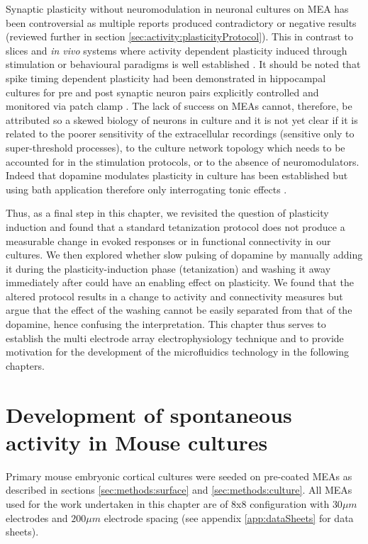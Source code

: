        Synaptic plasticity without neuromodulation in neuronal cultures on MEA has been controversial as multiple reports produced contradictory or negative results (reviewed further in section \ref{sec:activity:plasticityProtocol}). This in contrast to slices and \textit{in vivo} systems where activity dependent plasticity induced through stimulation or behavioural paradigms is well established \cite{caporale2008spike}. It should be noted that spike timing dependent plasticity had been demonstrated in hippocampal cultures for pre and post synaptic neuron pairs explicitly controlled and monitored via patch clamp \cite{bi1998synaptic}. The lack of success on MEAs cannot, therefore, be attributed so a skewed biology of neurons in culture and it is not yet clear if it is related to the poorer sensitivity of the extracellular recordings (sensitive only to super-threshold processes), to the culture network topology which needs to be accounted for in the stimulation protocols, or to the absence of neuromodulators. Indeed that dopamine modulates plasticity in culture has been established but using bath application therefore only interrogating tonic effects \cite{zhang2009gain,eytan2004dopamine}.

        Thus, as a final step in this chapter, we revisited the question of plasticity induction and found that a standard tetanization protocol does not produce a measurable change in evoked responses or in functional connectivity in our cultures. We then explored whether slow pulsing of dopamine by manually adding it during the plasticity-induction phase (tetanization) and washing it away immediately after could have an enabling effect on plasticity. We found that the altered protocol results in a change to activity and connectivity measures but argue that the effect of the washing cannot be easily separated from that of the dopamine, hence confusing the interpretation. This chapter thus serves to establish the multi electrode array electrophysiology technique and to provide motivation for the development of the microfluidics technology in the following chapters.
        	
    \section{Development of spontaneous activity in Mouse cultures}
    \label{sec:activity:spontActivity}
    Primary mouse embryonic cortical cultures were seeded on pre-coated MEAs as described in sections \ref{sec:methods:surface} and \ref{sec:methods:culture}. All MEAs used for the work undertaken in this chapter are of 8x8 configuration with \(30 \mu m\) electrodes and \(200 \mu m\) electrode spacing (see appendix \ref{app:dataSheets} for  data sheets).

